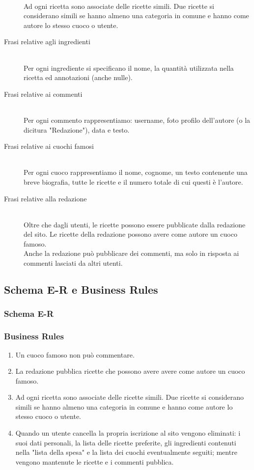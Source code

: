 \documentclass[12pt]{extarticle}
\begin{document}
\begin{description}
    \\ Ad ogni ricetta sono associate delle ricette simili. Due ricette si considerano simili se hanno almeno una categoria in comune e hanno come autore lo stesso cuoco o utente.
    \item[Frasi relative agli ingredienti] \hfill
    \\ Per ogni ingrediente si specificano il nome, la quantità utilizzata nella ricetta ed annotazioni (anche nulle).
    \item[Frasi relative ai commenti] \hfill
    \\ Per ogni commento rappresentiamo: username, foto profilo dell'autore (o la dicitura "Redazione"), data e testo.
    \item[Frasi relative ai cuochi famosi] \hfill
    \\ Per ogni cuoco rappresentiamo il nome, cognome, un testo contenente una breve biografia, tutte le ricette e il numero totale di cui questi è l'autore.
    \item[Frasi relative alla redazione] \hfill  
    \\ Oltre che dagli utenti, le ricette possono essere pubblicate dalla redazione del sito. Le ricette della redazione possono avere come autore un cuoco famoso.
    \\ Anche la redazione può pubblicare dei commenti, ma solo in risposta ai commenti lasciati da altri utenti.    
\end{description}

\newpage

\subsection{Schema E-R e Business Rules}
\subsubsection{Schema E-R}
\subsubsection{Business Rules}
\begin{enumerate}
    \item Un cuoco famoso non può commentare.
    \item La redazione pubblica ricette che possono avere avere come autore un cuoco famoso.
    \item Ad ogni ricetta sono associate delle ricette simili. Due ricette si considerano simili se hanno almeno una categoria in comune e hanno come autore lo stesso cuoco o utente.
    \item Quando un utente cancella la propria iscrizione al sito vengono eliminati: i suoi dati personali, la lista delle ricette preferite, gli ingredienti contenuti nella "lista della spesa" e la lista dei cuochi eventualmente seguiti; mentre vengono mantenute le ricette e i commenti pubblica.
\end{enumerate}
\end{document}
